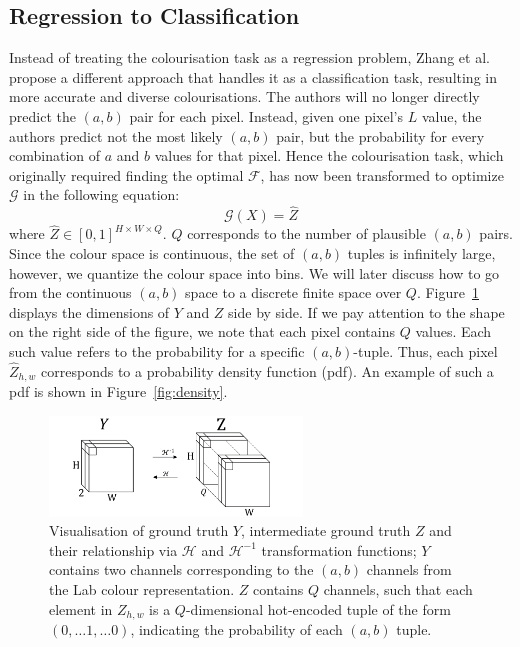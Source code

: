 \documentclass{article}
\begin{document}
\subsection{Regression to Classification}
Instead of treating the colourisation task as a regression problem, Zhang et al.~\cite{colourful} propose a different approach that handles it as a classification task, resulting in more accurate and diverse colourisations. The authors will no longer directly predict the $(a, b)$ pair for each pixel. Instead, given one pixel's $L$ value, the authors predict not the most likely $(a, b)$ pair, but the probability for every combination of $a$ and $b$ values for that pixel. Hence the colourisation task, which originally required finding the optimal $\mathcal{F}$, has now been transformed to optimize $\mathcal{G}$ in the following equation:
\[\mathcal{G}(X) = \hat{Z}\]
where $\hat{Z}\in\left[0,1\right]^{H\times W\times Q}$. $Q$ corresponds to the number of plausible $(a, b)$ pairs. Since the colour space is continuous, the set of $(a, b)$ tuples is infinitely large, however, we quantize the colour space into bins. We will later discuss how to go from the continuous $(a, b)$ space to a discrete finite space over $Q$. Figure~\ref{fig:conversion} displays the dimensions of $Y$ and $Z$ side by side. If we pay attention to the shape on the right side of the figure, we note that each pixel contains $Q$ values. Each such value refers to the probability for a specific $(a, b)$-tuple. Thus, each pixel ${\hat{Z}}_{h,w}$ corresponds to a probability density function (pdf). An example of such a pdf is shown in Figure~\ref{fig:density}.

\begin{figure}[h]
    \centering
    \includegraphics[width=0.6\textwidth]{GRAPHS/conversion.png}
    \caption{Visualisation of ground truth $Y$, intermediate ground truth $Z$ and their relationship via $\mathcal{H}$ and $\mathcal{H}^{-1}$ transformation functions; $Y$ contains two channels corresponding to the $(a, b)$ channels from the Lab colour representation. $Z$ contains $Q$ channels, such that each element in $Z_{h,w}$ is a $Q$-dimensional hot-encoded tuple of the form $\left(0,\ldots1,\ldots0\right)$, indicating the probability of each $(a, b)$ tuple. 
    }
    \label{fig:conversion}
\end{figure}
\end{document}
